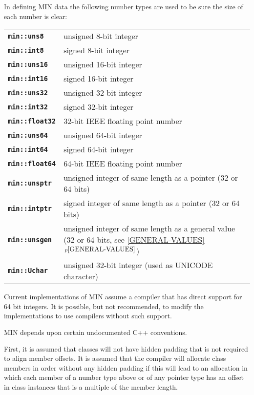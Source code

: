 \documentclass[12pt]{article}
\makeatletter
\newcommand{\TT}[1]{{\tt \bfseries #1}}
\newcommand{\ttindex}[1]{\index{#1@{\tt #1}}}
\newcommand{\minkey}[1]%
           {\TT{min::#1}\ttindex{min::#1}\ttindex{#1}}
\newcommand{\itemref}[1]{\ref{#1}$\,^{p\pageref{#1}}$}
\newcommand{\LABEL}[1]{\label{#1}}
\makeatother
\begin{document}
In defining MIN data the following number types are used to be sure
the size of each number is clear:
\begin{center}
\begin{tabular}{l@{~~~~~}p{4.5in}}
\minkey{uns8}	& unsigned 8-bit integer \\
\minkey{int8}	& signed 8-bit integer \\
\minkey{uns16}	& unsigned 16-bit integer \\
\minkey{int16}	& signed 16-bit integer \\
\minkey{uns32}	& unsigned 32-bit integer \\
\minkey{int32}	& signed 32-bit integer \\
\minkey{float32}	& 32-bit IEEE floating point number \\
\minkey{uns64}	& unsigned 64-bit integer \\
\minkey{int64}	& signed 64-bit integer \\
\minkey{float64}	& 64-bit IEEE floating point number \\
\minkey{unsptr}	& unsigned integer of same length as a pointer (32 or 64 bits)
                  \\
\minkey{intptr}	& signed integer of same length as a pointer (32 or 64 bits)
                  \\
\minkey{unsgen}	& unsigned integer of same length as a general value
                  (32 or 64 bits, see \itemref{GENERAL-VALUES})
                  \\
\minkey{Uchar}	& unsigned 32-bit integer (used as UNICODE character) \\
\end{tabular}
\end{center}%
\LABEL{MIN::UNS8}%
\LABEL{MIN::INT8}%
\LABEL{MIN::UNS16}%
\LABEL{MIN::INT16}%
\LABEL{MIN::UNS32}%
\LABEL{MIN::INT32}%
\LABEL{MIN::FLOAT32}%
\LABEL{MIN::UNS64}%
\LABEL{MIN::INT64}%
\LABEL{MIN::FLOAT64}%
\LABEL{MIN::UNSPTR}%
\LABEL{MIN::INTPTR}%
\LABEL{MIN::UNSGEN}%
\label{INT}%
\label{UNS}

Current implementations of MIN assume a compiler that has
direct support for 64 bit integers.  It is possible, but not recommended,
to modify the implementations to use compilers without such support.

MIN depends upon certain undocumented C++ conventions.

First, it is assumed that classes will not have hidden
padding that is not required to align member offsets.
It is assumed that the compiler will allocate class members
in order without any hidden padding if this will lead to
an allocation in which each member of a number type above or
of any pointer type has an offset in class instances
that is a multiple of the member length.
\end{document}
